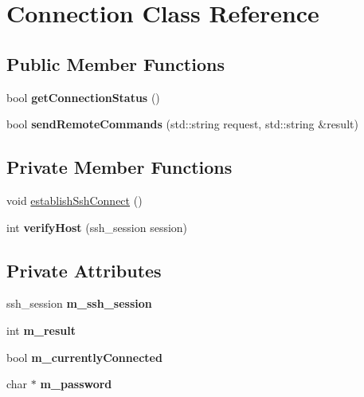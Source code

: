 \hypertarget{classConnection}{}\section{Connection Class Reference}
\label{classConnection}
\subsection*{Public Member Functions}
\begin{DoxyCompactItemize}
\item 
\mbox{\label{classConnection_a4cbf33699e3ca42a23eb8168be4d5287}} 
bool {\bfseries get\+Connection\+Status} ()
\item 
\mbox{\label{classConnection_ab59a9e6d364eff3f116e60b6ccc60f1b}} 
bool {\bfseries send\+Remote\+Commands} (std\+::string request, std\+::string \&result)
\end{DoxyCompactItemize}
\subsection*{Private Member Functions}
\begin{DoxyCompactItemize}
\item 
void \hyperlink{classConnection_a6ff354280eacd558865f34d95a1bfa95}{establish\+Ssh\+Connect} ()
\item 
\mbox{\label{classConnection_a1f148113eae10ea69fd54af1f2c6d8ad}} 
int {\bfseries verify\+Host} (ssh\+\_\+session session)
\end{DoxyCompactItemize}
\subsection*{Private Attributes}
\begin{DoxyCompactItemize}
\item 
\mbox{\label{classConnection_af70967306ab56018b8303a1330aa3f7f}} 
ssh\+\_\+session {\bfseries m\+\_\+ssh\+\_\+session}
\item 
\mbox{\label{classConnection_ac4432476199b9da0ac58496c0578cd89}} 
int {\bfseries m\+\_\+result}
\item 
\mbox{\label{classConnection_ac9ab118f67d8c509b92ab6c565a149eb}} 
bool {\bfseries m\+\_\+currently\+Connected}
\item 
\mbox{\label{classConnection_a53e09ae763001b83819c2b249a867802}} 
char $\ast$ {\bfseries m\+\_\+password}
\end{DoxyCompactItemize}


